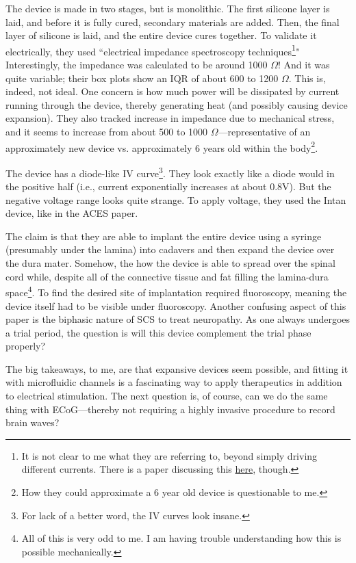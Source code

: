 \documentclass[12pt]{report}
\begin{document}
The device is made in two stages, but is monolithic. The first silicone layer is laid, and before it is fully cured, secondary materials are added. Then, the final layer of silicone is laid, and the entire device cures together. To validate it electrically, they used ``electrical impedance spectroscopy techniques\footnote{It is not clear to me what they are referring to, beyond simply driving different currents. There is a paper discussing this \href{https://www.ncbi.nlm.nih.gov/pmc/articles/PMC8512860/}{here}, though.}" Interestingly, the impedance was calculated to be around 1000 $\Omega$! And it was quite variable; their box plots show an IQR of about 600 to 1200 $\Omega$. This is, indeed, not ideal. One concern is how much power will be dissipated by current running through the device, thereby generating heat (and possibly causing device expansion). They also tracked increase in impedance due to mechanical stress, and it seems to increase from about 500 to 1000 $\Omega$---representative of an approximately new device vs. approximately 6 years old within the body\footnote{How they could approximate a 6 year old device is questionable to me.}.\newline

The device has a diode-like IV curve\footnote{For lack of a better word, the IV curves look insane.}. They look exactly like a diode would in the positive half (i.e., current exponentially increases at about 0.8V). But the negative voltage range looks quite strange. To apply voltage, they used the Intan device, like in the ACES paper.\newline

The claim is that they are able to implant the entire device using a syringe (presumably under the lamina) into cadavers and then expand the device over the dura mater. Somehow, the how the device is able to spread over the spinal cord while, despite all of the connective tissue and fat filling the lamina-dura space\footnote{All of this is very odd to me. I am having trouble understanding how this is possible mechanically.}. To find the desired site of implantation required fluoroscopy, meaning the device itself had to be visible under fluoroscopy. Another confusing aspect of this paper is the biphasic nature of SCS to treat neuropathy. As one always undergoes a trial period, the question is will this device complement the trial phase properly?\newline

The big takeaways, to me, are that expansive devices seem possible, and fitting it with microfluidic channels is a fascinating way to apply therapeutics in addition to electrical stimulation. The next question is, of course, can we do the same thing with ECoG---thereby not requiring a highly invasive procedure to record brain waves? 
\end{document}
